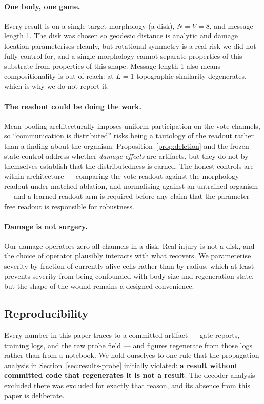 \paragraph{One body, one game.} Every result is on a single target morphology
(a disk), $N=V=8$, and message length 1. The disk was chosen so geodesic distance
is analytic and damage location parameterises cleanly, but rotational symmetry is
a real risk we did not fully control for, and a single morphology cannot separate
properties of this substrate from properties of this shape. Message length 1 also
means compositionality is out of reach: at $L=1$ topographic similarity
degenerates, which is why we do not report it.

\paragraph{The readout could be doing the work.} Mean pooling architecturally
imposes uniform participation on the vote channels, so ``communication is
distributed'' risks being a tautology of the readout rather than a finding about
the organism. Proposition~\ref{prop:deletion} and the frozen-state control
address whether \emph{damage effects} are artifacts, but they do not by
themselves establish that the distributedness is earned. The honest controls are
within-architecture --- comparing the vote readout against the morphology readout
under matched ablation, and normalising against an untrained organism --- and a
learned-readout arm is required before any claim that the parameter-free readout
is responsible for robustness. 

\paragraph{Damage is not surgery.} Our damage operators zero all channels in a
disk. Real injury is not a disk, and the choice of operator plausibly interacts
with what recovers. We parameterise severity by fraction of currently-alive cells
rather than by radius, which at least prevents severity from being confounded
with body size and regeneration state, but the shape of the wound remains a
designed convenience.

\subsection{Reproducibility}

Every number in this paper traces to a committed artifact --- gate reports,
training logs, and the raw probe field --- and figures regenerate from those logs
rather than from a notebook. We hold ourselves to one rule that the propagation
analysis in Section~\ref{sec:results-probe} initially violated: \textbf{a result
without committed code that regenerates it is not a result}. The decoder analysis
excluded there was excluded for exactly that reason, and its absence from this
paper is deliberate.

